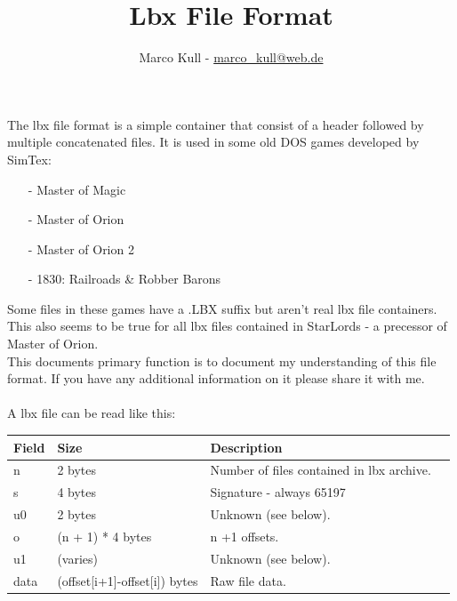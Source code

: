 \documentclass[a4paper]{scrartcl}
\begin{document}
\title{Lbx File Format}
\author{Marco Kull - \href{mailto:marco_kull@web.de}{marco\_kull@web.de}}\date{}
\maketitle
\thispagestyle{empty}
\pagestyle{empty}
The lbx file format is a simple container that consist of a header followed by multiple concatenated files. It is used in some old DOS games developed by SimTex:
\begin{itemize}
\item[-] Master of Magic
\item[-] Master of Orion
\item[-] Master of Orion 2
\item[-] 1830: Railroads \& Robber Barons
\end{itemize}
Some files in these games have a .LBX suffix but aren't real lbx file containers. This also seems to be true for all lbx files contained in StarLords - a precessor of Master of Orion.\\
This documents primary function is to document my understanding of this file format. If you have any additional information on it please share it with me.\\\\
A lbx file can be read like this:
\begin{flushleft}
\begin{tabular}{|l|l|l|l|}
\hline
\textbf{Field} & \textbf{Size} & \textbf{Description}\\ 
\hline \hline
n & 2 bytes & Number of files contained in lbx archive.\\\hline
s & 4 bytes & Signature - always 65197\\\hline
u0 & 2 bytes & Unknown (see below).\\\hline
o & (n + 1) * 4 bytes & n +1 offsets.\\\hline
u1 & (varies) & Unknown (see below).\\\hline
data & (offset[i+1]-offset[i]) bytes & Raw file data.\\\hline

\end{tabular}
\end{flushleft}
\end{document}

